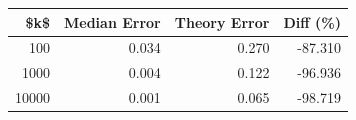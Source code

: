 \begin{tabular}{rrrr}
\toprule
  \$k\$ & Median Error & Theory Error & Diff (\%) \\
\midrule
  100 &        0.034 &        0.270 &  -87.310 \\
 1000 &        0.004 &        0.122 &  -96.936 \\
10000 &        0.001 &        0.065 &  -98.719 \\
\bottomrule
\end{tabular}
